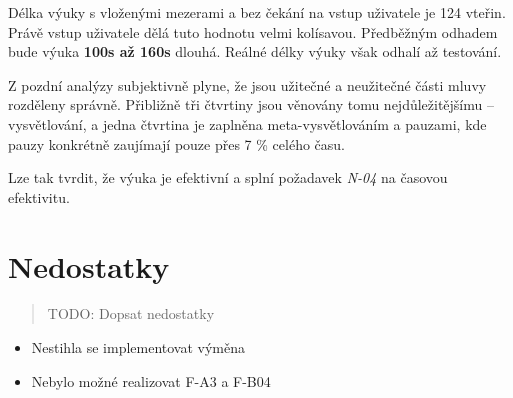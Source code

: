 Délka výuky s vloženými mezerami a bez
čekání na vstup uživatele je 124 vteřin. Právě vstup uživatele dělá tuto
hodnotu velmi kolísavou. Předběžným odhadem bude výuka \textbf{100s až
160s} dlouhá. Reálné délky výuky však odhalí až testování.

Z pozdní analýzy subjektivně plyne, že jsou užitečné a neužitečné
části mluvy rozděleny správně. Přibližně tři čtvrtiny jsou věnovány
tomu nejdůležitějšímu -- vysvětlování, a jedna čtvrtina je zaplněna
meta-vysvětlováním a pauzami, kde pauzy konkrétně zaujímají pouze přes 7
\% celého času.

Lze tak tvrdit, že výuka je efektivní a splní požadavek \emph{N-04} na
časovou efektivitu.

\section{Nedostatky}\label{nedostatky}

\begin{quote}
TODO: Dopsat nedostatky
\end{quote}

\begin{itemize}
\tightlist
\item
  Nestihla se implementovat výměna
\item
  Nebylo možné realizovat F-A3 a F-B04
\end{itemize}
